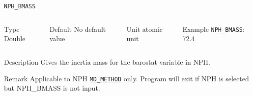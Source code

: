 \begin{frame}[allowframebreaks]{\texttt{NPH\_BMASS}} \label{NPH_BMASS}
\vspace*{-12pt}
\begin{columns}
\begin{block}{Type}
Double
\end{block}

\begin{block}{Default}
No default value
\end{block}

\begin{block}{Unit}
atomic unit
\end{block}

\begin{block}{Example}
\texttt{NPH\_BMASS}: 72.4
\end{block}
\end{columns}

\begin{block}{Description}
Gives the inertia mass for the barostat variable in NPH.
\end{block}

\begin{block}{Remark}
Applicable to NPH \hyperlink{MD_METHOD}{\texttt{MD\_METHOD}} only.
Program will exit if NPH is selected but NPH\_BMASS is not input. 
\end{block}

\end{frame}



